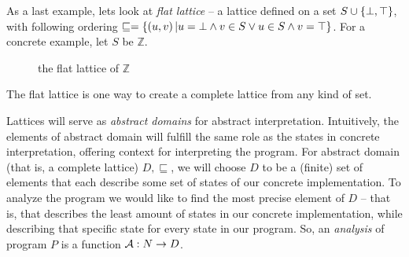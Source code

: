 \documentclass[..thesis.tex]{subfiles}
\begin{document}
As a last example, lets look at \textit{flat lattice} -- a lattice defined on a set $S \cup \left\lbrace \bot, \top \right\rbrace$, with following ordering $\sqsubseteq = \left\lbrace \left(  u,v \right)  | u = \bot \land v \in S \lor  u \in S \land  v = \top \right\rbrace$. For a concrete example, let $S$ be $\mathbb{Z}$.

\begin{figure}[H]
  \begin{center}
  \end{center}
  \caption{the flat lattice of $\mathbb{Z}$ }
\end{figure}

The flat lattice is one way to create a complete lattice from any kind of set.


Lattices will serve as \textit{abstract domains} for abstract interpretation. Intuitively, the elements of abstract domain will fulfill the same role as the states in concrete interpretation, offering context for interpreting the program. For abstract domain (that is, a complete lattice) $D,\sqsubseteq$, we will choose $D$ to be a (finite) set of elements that each describe some set of states of our concrete implementation. To analyze the program we would like to find the most precise element of $D$ -- that is, that describes the least amount of states in our concrete implementation, while describing that specific state for every state in our program. So, an \textit{analysis} of program $P$ is a function $\mathcal{A} : N \to D$.
\end{document}
